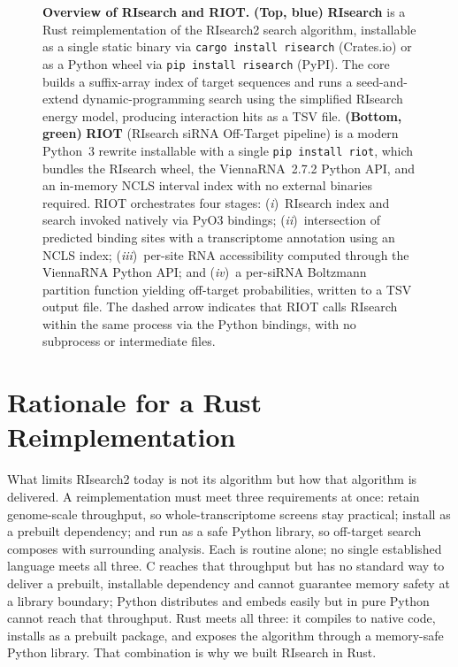 \begin{figure}[t]
\centering
\resizebox{\linewidth}{!}{}
\caption{%
  \textbf{Overview of RIsearch and RIOT.}
  \textbf{(Top, blue)} \textbf{RIsearch} is a Rust reimplementation of the
  RIsearch2 search algorithm, installable as a single static binary via
  \texttt{cargo install risearch} (Crates.io) or as a Python wheel via
  \texttt{pip install risearch} (PyPI).
  The core builds a suffix-array index of target sequences and runs a
  seed-and-extend dynamic-programming search using the simplified RIsearch
  energy model, producing interaction hits as a TSV file.
  \textbf{(Bottom, green)} \textbf{RIOT} (RIsearch siRNA Off-Target pipeline)
  is a modern Python~3 rewrite installable with a single \texttt{pip install riot},
  which bundles the RIsearch wheel, the ViennaRNA~2.7.2 Python API, and an
  in-memory NCLS interval index with no external binaries required.
  RIOT orchestrates four stages: (\textit{i})~RIsearch index and search
  invoked natively via PyO3 bindings; (\textit{ii})~intersection of predicted
  binding sites with a transcriptome annotation using an NCLS index;
  (\textit{iii})~per-site RNA accessibility computed through the ViennaRNA
  Python API; and (\textit{iv})~a per-siRNA Boltzmann partition function
  yielding off-target probabilities, written to a TSV output file.
  The dashed arrow indicates that RIOT calls RIsearch within the same process
  via the Python bindings, with no subprocess or intermediate files.%
}
\label{fig:summary}
\end{figure}

\section{Rationale for a Rust Reimplementation}\label{sec:rationale}

What limits RIsearch2 today is not its algorithm but how that algorithm is
delivered. A reimplementation must meet three requirements at once: retain
genome-scale throughput, so whole-transcriptome screens stay practical; install
as a prebuilt dependency; and run as a safe Python library, so off-target search
composes with surrounding analysis. Each is routine alone; no single established
language meets all three. C reaches that throughput but has no standard way to
deliver a prebuilt, installable dependency and cannot guarantee memory safety at
a library boundary; Python distributes and embeds easily but in pure Python
cannot reach that throughput. Rust meets all three: it compiles to native code,
installs as a prebuilt package, and exposes the algorithm through a memory-safe
Python library. That combination is why we built RIsearch in Rust.

